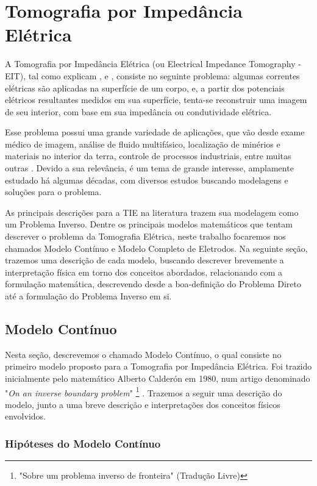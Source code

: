 \chapter{Tomografia por Impedância Elétrica}

A Tomografia por Impedância Elétrica (ou Electrical Impedance Tomography - EIT), tal como explicam ,  e ,  consiste no seguinte problema: algumas correntes elétricas são aplicadas na superfície de um corpo, e, a partir dos potenciais elétricos resultantes medidos em sua superfície, tenta-se reconstruir uma imagem de seu interior, com base em sua impedância ou condutividade elétrica. 

Esse problema possui uma grande variedade de aplicações, que vão desde exame médico de imagem, análise de fluido multifásico, localização de minérios e materiais no interior da terra, controle de processos industriais, entre muitas outras \cite{cheney}. Devido a sua relevância, é um tema de grande interesse, amplamente estudado há algumas décadas, com diversos estudos buscando modelagens e soluções para o problema.

As principais descrições para a TIE na literatura trazem sua modelagem como um Problema Inverso. Dentre os principais modelos matemáticos que tentam descrever o problema da Tomografia Elétrica, neste trabalho focaremos nos chamados Modelo Contínuo e Modelo Completo de Eletrodos. Na seguinte seção, trazemos uma descrição de cada modelo, buscando descrever brevemente a interpretação física em torno dos conceitos abordados, relacionando com a formulação matemática, descrevendo desde a boa-definição do Problema Direto até a formulação do Problema Inverso em si.

\section{Modelo Contínuo}

Nesta seção, descrevemos o chamado Modelo Contínuo, o qual consiste no primeiro modelo proposto para a Tomografia por Impedância Elétrica. Foi trazido inicialmente pelo matemático Alberto Calderón em 1980, num artigo denominado "\textit{On an inverse boundary problem}" \footnote{"Sobre um problema inverso de fronteira" (Tradução Livre)} \cite{calderon}. Trazemos a seguir uma descrição do modelo, junto a uma breve descrição e interpretações dos conceitos físicos envolvidos.

\subsection{Hipóteses do Modelo Contínuo}

